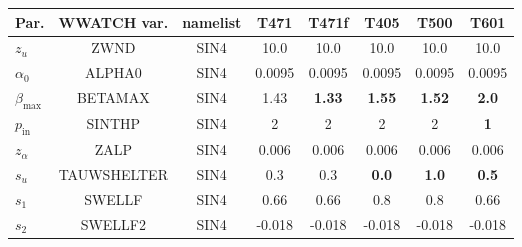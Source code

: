 \begin{landscape}
\begin{table}
\begin{center}
\begin{tabular}{|l|c|c|c|c|c|c|c|} \hline \hline
Par.         &  WWATCH var.       & namelist & T471    & T471f       & T405          & T500         & T601     \\
\hline
  $z_u$ &  ZWND                       & SIN4 & 10.0    & 10.0        & 10.0          & 10.0         & 10.0        \\
  $\alpha_0$ &  ALPHA0                & SIN4 & 0.0095  & 0.0095      & 0.0095        &  0.0095      & 0.0095      \\
  $\beta_{\mathrm{max}}$ & BETAMAX    & SIN4 & 1.43    &\textbf{1.33}& \textbf{1.55} &\textbf{1.52} & \textbf{2.0}\\
  $p_{\mathrm{in}}$ &  SINTHP         & SIN4 & 2       & 2           & 2             &  2           & \textbf{1}  \\
  $z_\alpha$ &  ZALP                  & SIN4 & 0.006   & 0.006       & 0.006         &0.006         & 0.006       \\
  $s_u$ &  TAUWSHELTER                & SIN4 & 0.3     & 0.3         & \textbf{0.0}  &\textbf{1.0}  & \textbf{0.5}\\
  $s_1$ &  SWELLF                     & SIN4 & 0.66    & 0.66        & 0.8           &  0.8         & 0.66        \\
  $s_2$ &  SWELLF2                    & SIN4 & -0.018  & -0.018      & -0.018        &  -0.018      &  -0.018     \\

\end{tabular}
\end{center}
\end{table}
\end{landscape}
